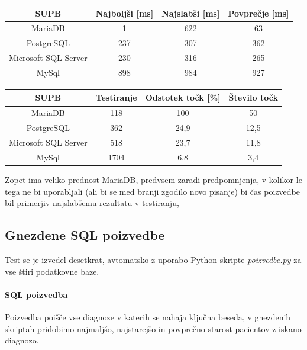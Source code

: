 \documentclass[a4paper,11pt]{report}
\begin{document}
\begin{center}
   \begin{tabular}{||c|c|c|c||}
      \hline
      \textbf{SUPB} & \textbf{Najboljši [ms]} & \textbf{Najslabši [ms]} & \textbf{Povprečje [ms]}\\
      \hline
      \hline
      MariaDB & 1 & 622 & 63 \\
      PostgreSQL & 237 & 307 & 362 \\
      Microsoft SQL Server & 230 & 316 & 265 \\
      MySql & 898 & 984 & 927\\
      \hline
   \end{tabular}
\end{center}

\begin{center}
   \begin{tabular}{||c|c|c|c||}
      \hline
      \textbf{SUPB} & \textbf{Testiranje} & \textbf{Odstotek točk [\%]} & \textbf{Število točk}\\
      \hline
      \hline
      MariaDB & 118 & 100 & 50 \\
      PostgreSQL & 362 & 24,9 & 12,5\\
      Microsoft SQL Server & 518 & 23,7 & 11,8 \\
      MySql & 1704 & 6,8 & 3,4 \\
      \hline
   \end{tabular}
\end{center}

Zopet ima veliko prednost MariaDB, predvsem zaradi predpomnjenja, v kolikor le tega ne bi uporabljali (ali bi se med branji zgodilo novo pisanje) bi čas poizvedbe bil primerjiv najslabšemu rezultatu v testiranju,

\pagebreak
\subsection{Gnezdene SQL poizvedbe}
Test se je izvedel desetkrat, avtomatsko z uporabo Python skripte \textit{poizvedbe.py} za vse štiri podatkovne baze.

\paragraph{SQL poizvedba}
Poizvedba poišče vse diagnoze v katerih se nahaja ključna beseda, v gnezdenih skriptah pridobimo
najmaljšo, najstarejšo in povprečno starost pacientov z iskano diagnozo.
\end{document}
